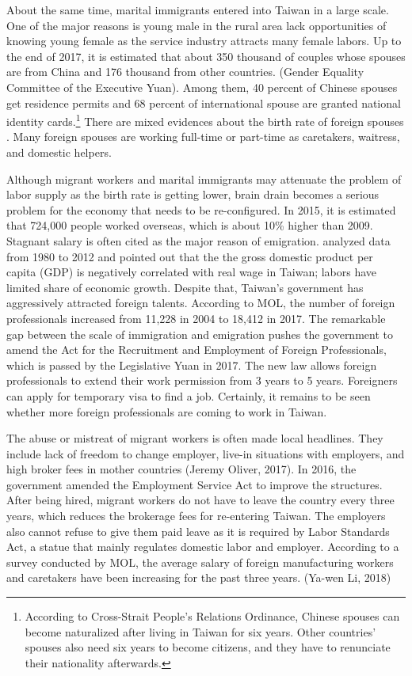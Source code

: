 \documentclass[12pt]{article}
\begin{document}
About the same time, marital immigrants entered into Taiwan in a large scale. One of the major reasons is young male in the rural area lack opportunities of knowing young female as the service industry attracts many female labors. Up to the end of 2017, it is estimated that about 350 thousand of couples whose spouses are from China and 176 thousand from other countries. (Gender Equality Committee of the Executive Yuan). Among them, 40 percent of Chinese spouses get residence permits and 68 percent of international spouse are granted national identity cards.\footnote{According to Cross-Strait People's Relations Ordinance, Chinese spouses can become naturalized after living in Taiwan for six years. Other countries' spouses also need six years to become citizens, and they have to renunciate their nationality afterwards.} There are mixed evidences about the birth rate of foreign spouses \citep{MoLai2004, Yangetal2012}. Many foreign spouses are working full-time or part-time as caretakers, waitress, and domestic helpers.


Although migrant workers and marital immigrants may attenuate the problem of labor supply as the birth rate is getting lower, brain drain becomes a serious problem for the economy that needs to be re-configured. In 2015, it is estimated that 724,000 people worked overseas, which is about 10\% higher than 2009. Stagnant salary is often cited as the major reason of emigration. \cite{LinChangLu2017} analyzed data from 1980 to 2012 and pointed out that the the gross domestic product per capita (GDP) is negatively correlated with real wage in Taiwan; labors have limited share of economic growth. Despite that, Taiwan's government has aggressively attracted foreign talents. According to MOL, the number of foreign professionals increased from 11,228 in 2004 to 18,412 in 2017. The remarkable gap between the scale of immigration and emigration pushes the government to amend the Act for the Recruitment and Employment of Foreign Professionals, which is passed by the Legislative Yuan in 2017. The new law allows foreign professionals to extend their work permission from 3 years to 5 years. Foreigners can apply for temporary visa to find a job. Certainly, it remains to be seen whether more foreign professionals are coming to work in Taiwan.


The abuse or mistreat of migrant workers is often made local headlines. They include lack of freedom to change employer, live-in situations with employers, and high broker fees in mother countries (Jeremy Oliver, 2017). In 2016, the government amended the Employment Service Act to improve the structures. After being hired, migrant workers do not have to leave the country every three years, which reduces the brokerage fees for re-entering Taiwan. The employers also cannot refuse to give them paid leave as it is required by Labor Standards Act, a statue that mainly regulates domestic labor and employer. According to a survey conducted by MOL, the average salary of foreign manufacturing workers and caretakers have been increasing for the past three years. (Ya-wen Li, 2018)
\end{document}

